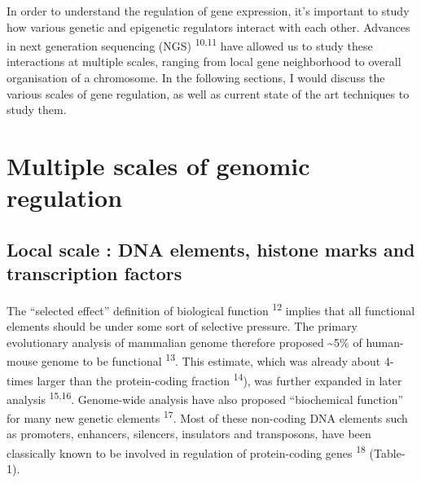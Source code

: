 \documentclass[11pt,twoside]{MPIthesis}
\theoremstyle{definition}
\theoremstyle{definition}
\theoremstyle{definition}
\theoremstyle{remark}
\begin{document}
In order to understand the regulation of gene expression, it's important
to study how various genetic and epigenetic regulators interact with
each other. Advances in next generation sequencing (NGS)
\textsuperscript{10,11} have allowed us to study these interactions at
multiple scales, ranging from local gene neighborhood to overall
organisation of a chromosome. In the following sections, I would discuss
the various scales of gene regulation, as well as current state of the
art techniques to study them.

\section{Multiple scales of genomic
regulation}\label{multiple-scales-of-genomic-regulation}

\subsection{Local scale : DNA elements, histone marks and transcription
factors}\label{local-scale-dna-elements-histone-marks-and-transcription-factors}

The ``selected effect'' definition of biological function
\textsuperscript{12} implies that all functional elements should be
under some sort of selective pressure. The primary evolutionary analysis
of mammalian genome therefore proposed \textasciitilde{}5\% of
human-mouse genome to be functional \textsuperscript{13}. This estimate,
which was already about 4-times larger than the protein-coding fraction
\textsuperscript{14}), was further expanded in later analysis
\textsuperscript{15,16}. Genome-wide analysis have also proposed
``biochemical function'' for many new genetic elements
\textsuperscript{17}. Most of these non-coding DNA elements such as
promoters, enhancers, silencers, insulators and transposons, have been
classically known to be involved in regulation of protein-coding genes
\textsuperscript{18} (Table-1).
\end{document}
